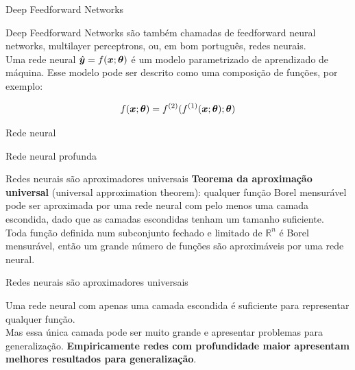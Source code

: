 \documentclass[10pt]{beamer}
\begin{document}
\begin{frame}{Deep Feedforward Networks}

\alert{Deep Feedforward Networks} são também chamadas de \alert{feedforward neural networks}, \alert{multilayer perceptrons}, ou, em bom português, \alert{redes neurais}.\\


Uma rede neural $\hat{\bm{y}} = f(\bm{x}; \bm{\theta})$ é um modelo parametrizado de aprendizado de máquina. Esse modelo pode ser descrito como uma composição de funções, por exemplo:

\begin{equation*}
f(\bm{x}; \bm{\theta}) = f^{(2)}(f^{(1)}(\bm{x}; \bm{\theta}); \bm{\theta})
\end{equation*}
\end{frame}

\begin{frame}{Rede neural}

\end{frame}

\begin{frame}{Rede neural profunda}

\end{frame}

\begin{frame}{Redes neurais são aproximadores universais}
\textbf{Teorema da aproximação universal} (universal approximation theorem): qualquer função Borel mensurável pode ser aproximada por uma rede neural com pelo menos uma camada escondida, dado que as camadas escondidas tenham um tamanho suficiente.\\

Toda função definida num subconjunto fechado e limitado de $\mathbb{R}^{n}$ é Borel mensurável, então um grande número de funções são aproximáveis por uma rede neural.  
\end{frame}

\begin{frame}{Redes neurais são aproximadores universais}

Uma rede neural com apenas uma camada escondida é suficiente para representar qualquer função. \\

Mas essa única camada pode ser muito grande e apresentar problemas para generalização. \textbf{Empiricamente redes com profundidade maior apresentam melhores resultados para generalização}.
\end{frame}
\end{document}
